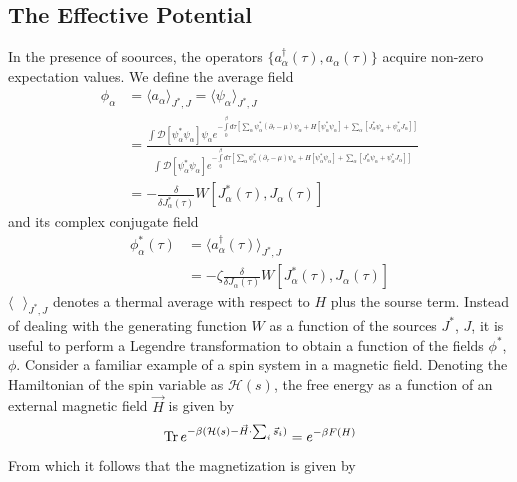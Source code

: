 \documentclass[12pt]{article}
\begin{document}
\subsection*{The Effective Potential}
In the presence of soources, the operators $\{a^\dagger_\alpha(\tau),a_\alpha
(\tau)\}$ acquire non-zero expectation values. We define the average field
\begin{equation*}
    \begin{split}
        \phi_\alpha&=\langle a_\alpha\rangle_{J^*,J}=\langle \psi_\alpha
        \rangle_{J^*,J}\\
        &=\frac{\int\mathcal{D}[\psi^*_\alpha\psi_\alpha]\psi_\alpha
        e^{-\int\limits_0^\beta d\tau\left[\sum_\alpha\psi^*_\alpha(\partial_\tau
        -\mu)\psi_\alpha+H[\psi^*_\alpha\psi_\alpha]+\sum_\alpha[J^*_\alpha
        \psi_\alpha+\psi^*_\alpha J_\alpha]\right]}}{\int\mathcal{D}[\psi^*_\alpha
        \psi_\alpha]e^{-\int\limits_0^\beta d\tau\left[\sum_\alpha\psi^*_\alpha
        (\partial_\tau-\mu)\psi_\alpha+H[\psi^*_\alpha\psi_\alpha]+\sum_\alpha
        [J^*_\alpha\psi_\alpha+\psi^*_\alpha J_\alpha]\right]}}\\
        &=-\frac{\delta}{\delta J^*_\alpha(\tau)}W[J^*_\alpha(\tau),J_\alpha(\tau)]
    \end{split}
\end{equation*}
and its complex conjugate field
\begin{equation*}
    \begin{split}
        \phi^*_\alpha(\tau)&=\langle a^\dagger_\alpha(\tau)\rangle_{J^*,J}\\
        &=-\zeta\frac{\delta}{\delta J_\alpha(\tau)}W[J^*_\alpha(\tau),J_\alpha
        (\tau)]
    \end{split}
\end{equation*}
$\langle\ \ \ \rangle_{J^*,J}$ denotes a thermal average with respect to $H$ 
plus the sourse term.
Instead of dealing with the generating function $W$ as a function of the sources 
$J^*$, $J$, it is useful to perform a Legendre transformation to obtain a function 
of the fields $\phi^*$, $\phi$. Consider a familiar example of a spin system in 
a magnetic field. Denoting the Hamiltonian of the spin variable as 
$\mathcal{H}(s)$, the free energy as a function of an external magnetic field 
$\vec{H}$ is given by
\begin{equation*}
    \Tr e^{-\beta(\mathcal{H}(s)-\vec{H}\cdot\sum_i\vec{s}_i)}=e^{-\beta F(H)}
\end{equation*}
From which it follows that the magnetization is given by 
\end{document}
